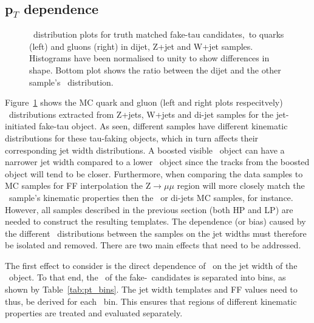 	\subsection*{p$_T$ dependence}
	
	\label{subsec:pt_reweight}
	\begin{figure}[!hbt]
		\begin{center}
			\hspace{0.03\textwidth}
			\hspace{0.03\textwidth}
		\end{center}
		\caption{\htau \pt\ distribution plots for truth matched fake-tau candidates,\ie\ to quarks (left) and gluons (right) in dijet, Z+jet and W+jet samples. Histograms have been normalised to unity to show differences in shape. Bottom plot shows the ratio between the dijet and the other sample's \pt\ distribution.}
	\label{fig:MCtemp_qgu}
	\end{figure}		
	Figure~\ref{fig:MCtemp_qgu} shows the MC quark and gluon (left and right plots respecitvely)
	 \pt\ distributions extracted from Z+jets, W+jets and di-jet samples for the jet-initiated fake-tau object. As seen, different samples have different kinematic distributions for these tau-faking objects, which in turn affects their corresponding jet width distributions. 
	A boosted visible \htau\ object can have a narrower jet width compared to a lower \pt\ object since the tracks from the boosted object will tend to be closer. Furthermore, when comparing the data samples to \ac{MC} samples for \ac{FF} interpolation the Z$\rightarrow\mu\mu$ region will more closely match the \Zjets\ sample's kinematic properties then the \Wjets\ or di-jets \ac{MC} samples, for instance. However, all samples described in the previous section (both \ac{HP} and \ac{LP}) are needed to construct the resulting templates. 
	The dependence (or bias) caused by the different \pt\ distributions between the samples on the jet widths must therefore be isolated and removed. 
	There are two main effects that need to be addressed. 
	
	The first effect to consider is the direct dependence of \pt\ on the jet width of the \htau\ object. 
	To that end, the \pt\ of the fake-\htau\ candidates is separated into bins, as shown by Table~\ref{tab:pt_bins}.
	The jet width templates and FF values need to thus, be derived for each \pt\ bin. This ensures that regions of different kinematic properties are treated and evaluated separately.
	
